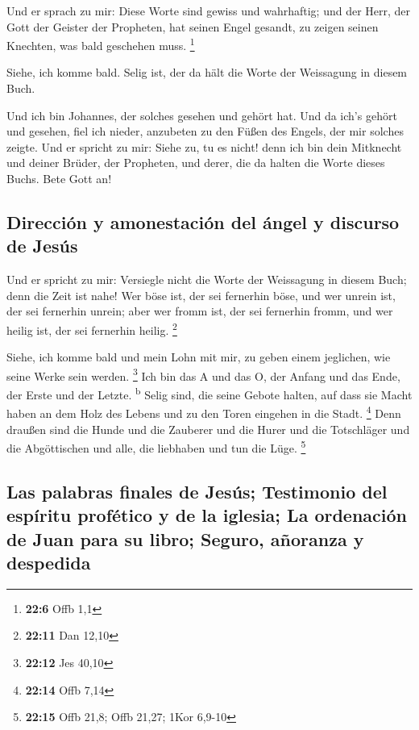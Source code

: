  Und er sprach zu mir: Diese Worte sind gewiss und
wahrhaftig; und der Herr, der Gott der Geister der Propheten, hat seinen
Engel gesandt, zu zeigen seinen Knechten, was bald geschehen muss.
\footnote{\textbf{22:6} Offb 1,1}

 Siehe, ich komme bald. Selig ist, der da hält die Worte
der Weissagung in diesem Buch.

 Und ich bin Johannes, der solches gesehen und gehört hat.
Und da ich's gehört und gesehen, fiel ich nieder, anzubeten zu den Füßen
des Engels, der mir solches zeigte.  Und er spricht zu
mir: Siehe zu, tu es nicht! denn ich bin dein Mitknecht und deiner
Brüder, der Propheten, und derer, die da halten die Worte dieses Buchs.
Bete Gott an!

\hypertarget{direcciuxf3n-y-amonestaciuxf3n-del-uxe1ngel-y-discurso-de-jesuxfas}{%
\subsection{Dirección y amonestación del ángel y discurso de
Jesús}\label{direcciuxf3n-y-amonestaciuxf3n-del-uxe1ngel-y-discurso-de-jesuxfas}}

 Und er spricht zu mir: Versiegle nicht die Worte der
Weissagung in diesem Buch; denn die Zeit ist nahe!  Wer
böse ist, der sei fernerhin böse, und wer unrein ist, der sei fernerhin
unrein; aber wer fromm ist, der sei fernerhin fromm, und wer heilig ist,
der sei fernerhin heilig. \footnote{\textbf{22:11} Dan 12,10}

 Siehe, ich komme bald und mein Lohn mit mir, zu geben
einem jeglichen, wie seine Werke sein werden. \footnote{\textbf{22:12}
  Jes 40,10}  Ich bin das A und das O, der Anfang und das
Ende, der Erste und der Letzte. \textsuperscript{b} 
Selig sind, die seine Gebote halten, auf dass sie Macht haben an dem
Holz des Lebens und zu den Toren eingehen in die Stadt. \footnote{\textbf{22:14}
  Offb 7,14}  Denn draußen sind die Hunde und die
Zauberer und die Hurer und die Totschläger und die Abgöttischen und
alle, die liebhaben und tun die Lüge. \footnote{\textbf{22:15} Offb
  21,8; Offb 21,27; 1Kor 6,9-10}

\hypertarget{las-palabras-finales-de-jesuxfas-testimonio-del-espuxedritu-profuxe9tico-y-de-la-iglesia-la-ordenaciuxf3n-de-juan-para-su-libro-seguro-auxf1oranza-y-despedida}{%
\subsection{Las palabras finales de Jesús; Testimonio del espíritu
profético y de la iglesia; La ordenación de Juan para su libro; Seguro,
añoranza y
despedida}\label{las-palabras-finales-de-jesuxfas-testimonio-del-espuxedritu-profuxe9tico-y-de-la-iglesia-la-ordenaciuxf3n-de-juan-para-su-libro-seguro-auxf1oranza-y-despedida}}


